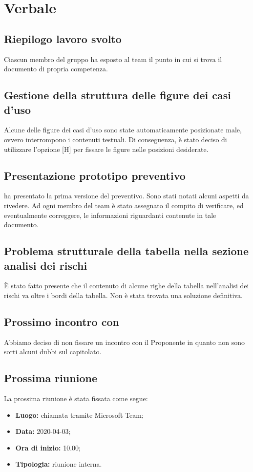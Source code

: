 \section{Verbale}
	
	\subsection{Riepilogo lavoro svolto}
		Ciascun membro del gruppo ha esposto al team il punto in cui si trova il documento di propria competenza.

	\subsection{Gestione della struttura delle figure dei casi d'uso}
		Alcune delle figure dei casi d'uso sono state automaticamente posizionate male, ovvero interrompono i contenuti testuali. Di conseguenza, è stato deciso di utilizzare l'opzione [H] per fissare le figure nelle posizioni desiderate.

	\subsection{Presentazione prototipo preventivo}
		\MP{} ha presentato la prima versione del preventivo. Sono stati notati alcuni aspetti da rivedere. Ad ogni membro del team è stato assegnato il compito di verificare, ed eventualmente correggere, le informazioni riguardanti contenute in tale documento.
		
	\subsection{Problema strutturale della tabella nella sezione analisi dei rischi}
		È stato fatto presente che il contenuto di alcune righe della tabella nell'analisi dei rischi va oltre i bordi della tabella. Non è stata trovata una soluzione definitiva. 

	\subsection{Prossimo incontro con \Proponente{}}
	    Abbiamo deciso di non fissare un incontro con il Proponente in quanto non sono sorti alcuni dubbi sul capitolato. 

	\subsection{Prossima riunione}
		La prossima riunione è stata fissata come segue: 
		\begin{itemize}
			\item \textbf{Luogo: } chiamata tramite Microsoft Team; 
			\item \textbf{Data: } 2020-04-03; 
			\item \textbf{Ora di inizio: } 10.00;
			\item \textbf{Tipologia: } riunione interna.
		\end{itemize}